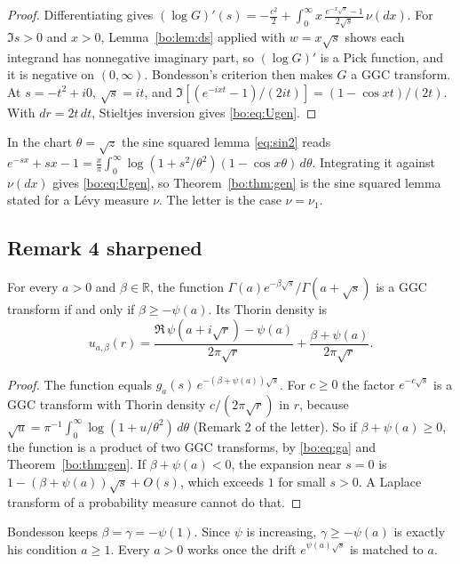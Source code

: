 \begin{proof}
Differentiating gives $(\log G)'(s)=-\frac{c^2}{2}+\int_0^\infty x\,\frac{e^{-x\sqrt s}-1}{2\sqrt s}\,\nu(dx)$. For $\Im s>0$ and $x>0$, Lemma~\ref{bo:lem:ds} applied with $w=x\sqrt s$ shows each integrand has nonnegative imaginary part, so $(\log G)'$ is a Pick function, and it is negative on $(0,\infty)$. Bondesson's criterion then makes $G$ a GGC transform. At $s=-t^2+i0$, $\sqrt s=it$, and $\Im[(e^{-ixt}-1)/(2it)]=(1-\cos xt)/(2t)$. With $dr=2t\,dt$, Stieltjes inversion gives \eqref{bo:eq:Ugen}.
\end{proof}

\begin{remark}
In the chart $\theta=\sqrt z$ the sine squared lemma \eqref{eq:sin2} reads $e^{-sx}+sx-1=\frac x\pi\int_0^\infty\log(1+s^2/\theta^2)(1-\cos x\theta)\,d\theta$. Integrating it against $\nu(dx)$ gives \eqref{bo:eq:Ugen}, so Theorem~\ref{bo:thm:gen} is the sine squared lemma stated for a L\'evy measure $\nu$. The letter is the case $\nu=\nu_1$.
\end{remark}

\subsection{Remark 4 sharpened}

\begin{proposition}\label{bo:prop:sharp}
For every $a>0$ and $\beta\in\mathbb R$, the function $\Gamma(a)e^{-\beta\sqrt s}/\Gamma(a+\sqrt s)$ is a GGC transform if and only if $\beta\ge-\psi(a)$. Its Thorin density is
\[
u_{a,\beta}(r)=\frac{\Re\,\psi(a+i\sqrt r)-\psi(a)}{2\pi\sqrt r}+\frac{\beta+\psi(a)}{2\pi\sqrt r}.
\]
\end{proposition}

\begin{proof}
The function equals $g_a(s)\,e^{-(\beta+\psi(a))\sqrt s}$. For $c\ge0$ the factor $e^{-c\sqrt s}$ is a GGC transform with Thorin density $c/(2\pi\sqrt r)$ in $r$, because $\sqrt u=\pi^{-1}\int_0^\infty\log(1+u/\theta^2)\,d\theta$ (Remark 2 of the letter). So if $\beta+\psi(a)\ge0$, the function is a product of two GGC transforms, by \eqref{bo:eq:ga} and Theorem~\ref{bo:thm:gen}. If $\beta+\psi(a)<0$, the expansion near $s=0$ is $1-(\beta+\psi(a))\sqrt s+O(s)$, which exceeds $1$ for small $s>0$. A Laplace transform of a probability measure cannot do that.
\end{proof}

Bondesson keeps $\beta=\gamma=-\psi(1)$. Since $\psi$ is increasing, $\gamma\ge-\psi(a)$ is exactly his condition $a\ge1$. Every $a>0$ works once the drift $e^{\psi(a)\sqrt s}$ is matched to $a$.

